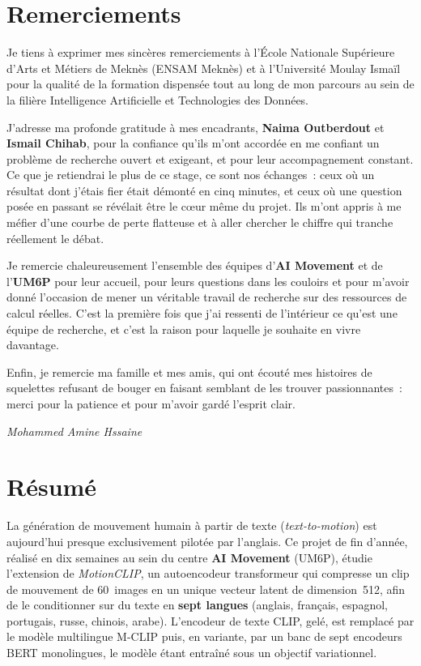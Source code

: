 \documentclass[12pt,a4paper,oneside]{report}
\theoremstyle{definition}
\theoremstyle{plain}
\begin{document}

\chapter*{Remerciements}

Je tiens à exprimer mes sincères remerciements à l'École Nationale Supérieure
d'Arts et Métiers de Meknès (ENSAM Meknès) et à l'Université Moulay Ismaïl pour
la qualité de la formation dispensée tout au long de mon parcours au sein de la
filière Intelligence Artificielle et Technologies des Données.

J'adresse ma profonde gratitude à mes encadrants, \textbf{Naima Outberdout} et
\textbf{Ismail Chihab}, pour la confiance qu'ils m'ont accordée en me confiant
un problème de recherche ouvert et exigeant, et pour leur accompagnement
constant. Ce que je retiendrai le plus de ce stage, ce sont nos échanges~: ceux
où un résultat dont j'étais fier était démonté en cinq minutes, et ceux où une
question posée en passant se révélait être le cœur même du projet. Ils m'ont
appris à me méfier d'une courbe de perte flatteuse et à aller chercher le chiffre
qui tranche réellement le débat.

Je remercie chaleureusement l'ensemble des équipes d'\textbf{AI Movement} et de
l'\textbf{UM6P} pour leur accueil, pour leurs questions dans les couloirs et pour
m'avoir donné l'occasion de mener un véritable travail de recherche sur des
ressources de calcul réelles. C'est la première fois que j'ai ressenti de
l'intérieur ce qu'est une équipe de recherche, et c'est la raison pour laquelle
je souhaite en vivre davantage.

Enfin, je remercie ma famille et mes amis, qui ont écouté mes histoires de
squelettes refusant de bouger en faisant semblant de les trouver passionnantes~:
merci pour la patience et pour m'avoir gardé l'esprit clair.

\begin{flushright}
\textit{Mohammed Amine Hssaine}
\end{flushright}

\chapter*{Résumé}

La génération de mouvement humain à partir de texte (\emph{text-to-motion}) est
aujourd'hui presque exclusivement pilotée par l'anglais. Ce projet de fin
d'année, réalisé en dix semaines au sein du centre \textbf{AI Movement} (UM6P), étudie
l'extension de \emph{MotionCLIP}, un autoencodeur transformeur qui compresse
un clip de mouvement de 60~images en un unique vecteur latent de dimension~512,
afin de le conditionner sur du texte en \textbf{sept langues} (anglais,
français, espagnol, portugais, russe, chinois, arabe). L'encodeur de texte CLIP,
gelé, est remplacé par le modèle multilingue M-CLIP puis, en variante, par un
banc de sept encodeurs BERT monolingues, le modèle étant entraîné sous un
objectif variationnel.
\end{document}
